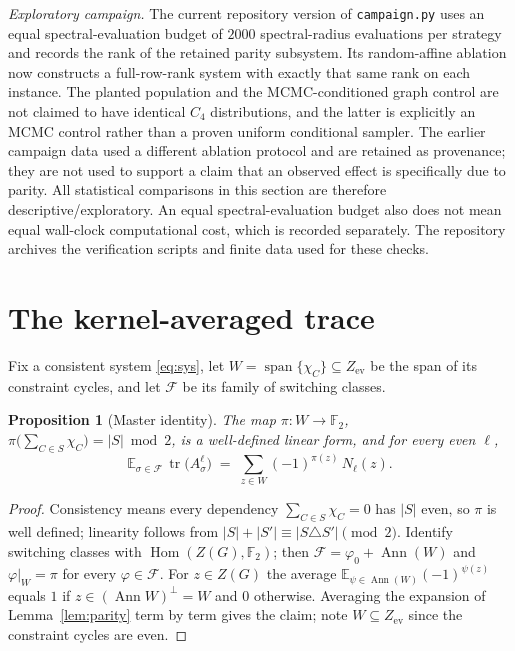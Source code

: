 \documentclass[11pt]{article}
\newtheorem{proposition}[lemma]{Proposition}
\theoremstyle{remark}
\newcommand{\F}{\mathbb{F}}
\newcommand{\Ze}{Z_{\mathrm{ev}}}
\DeclareMathOperator{\tr}{tr}
\begin{document}
\emph{Exploratory campaign.} The current repository version of
\texttt{campaign.py} uses an equal spectral-evaluation budget of $2000$
spectral-radius evaluations per strategy and records the rank of the
retained parity subsystem. Its random-affine ablation now constructs a
full-row-rank system with exactly that same rank on each instance. The
planted population and the MCMC-conditioned graph control are not claimed
to have identical $C_4$ distributions, and the latter is explicitly an
MCMC control rather than a proven uniform conditional sampler. The earlier
campaign data used a different ablation protocol and are retained as
provenance; they are not used to support a claim that an observed effect is
specifically due to parity. All statistical comparisons in this section
are therefore descriptive/exploratory. An equal spectral-evaluation budget
also does not mean equal wall-clock computational cost, which is recorded
separately. The repository archives the verification scripts and finite data
used for these checks.

\section{The kernel-averaged trace}\label{sec:kernel}

Fix a consistent system \eqref{eq:sys}, let
$W=\operatorname{span}\{\chi_C\}\subseteq\Ze$ be the span of its
constraint cycles, and let $\mathcal F$ be its family of switching
classes.

\begin{proposition}[Master identity]\label{prop:master}
The map $\pi\colon W\to\F_2$,
$\pi\big(\sum_{C\in S}\chi_C\big)=|S|\bmod2$, is a well-defined linear
form, and for every even $\ell$,
\[
\mathbb E_{\sigma\in\mathcal F}\,\tr\!\big(A_\sigma^{\ell}\big)
\;=\;\sum_{z\in W}(-1)^{\pi(z)}\,N_\ell(z).
\]
\end{proposition}

\begin{proof}
Consistency means every dependency $\sum_{C\in S}\chi_C=0$ has $|S|$
even, so $\pi$ is well defined; linearity follows from
$|S|+|S'|\equiv|S\triangle S'|\pmod2$. Identify switching classes with
$\operatorname{Hom}(Z(G),\F_2)$; then
$\mathcal F=\varphi_0+\operatorname{Ann}(W)$ and $\varphi|_W=\pi$ for
every $\varphi\in\mathcal F$. For $z\in Z(G)$ the average
$\mathbb E_{\psi\in\operatorname{Ann}(W)}(-1)^{\psi(z)}$ equals $1$ if
$z\in(\operatorname{Ann}W)^{\perp}=W$ and $0$ otherwise. Averaging the
expansion of Lemma~\ref{lem:parity} term by term gives the claim; note
$W\subseteq\Ze$ since the constraint cycles are even.
\end{proof}
\end{document}
